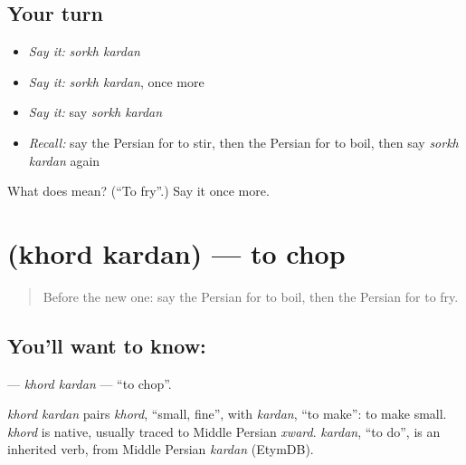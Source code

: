 \subsection*{Your turn}
\begin{itemize}
\raggedright
  \item \emph{Say it:} \emph{sorkh kardan}
  \item \emph{Say it:} \emph{sorkh kardan}, once more
  \item \emph{Say it:} say \emph{sorkh kardan}
  \item \emph{Recall:} say the Persian for to stir, then the Persian for to boil, then say \emph{sorkh kardan} again
\end{itemize}

\begin{tcolorbox}[breakable,colback=teal!4,colframe=teal!35!black,title={Before you move on}]
What does   mean? (\textquotedblleft{}To fry\textquotedblright{}.) Say it once more.
\end{tcolorbox}
\section[\texorpdfstring{\fa{خرد} \fa{کردن} (khord kardan)}{خرد کردن (khord kardan)}]{  (khord kardan) — to chop}

\label{lesson:FA-C180-khord-kardan}



\begin{quote}
Before the new one: say the Persian for to boil, then the Persian for to fry.
\end{quote}

\subsection*{You'll want to know:  }
\textbf{ } — \emph{khord kardan} — \textquotedblleft{}to chop\textquotedblright{}.

\begin{cousinweb}
\emph{khord kardan} pairs \emph{khord}, \textquotedblleft{}small, fine\textquotedblright{}, with \emph{kardan}, \textquotedblleft{}to make\textquotedblright{}: to make small. \emph{khord} is native, usually traced to Middle Persian \emph{xward}. \emph{kardan}, \textquotedblleft{}to do\textquotedblright{}, is an inherited verb, from Middle Persian \emph{kardan} (EtymDB).
\end{cousinweb}

